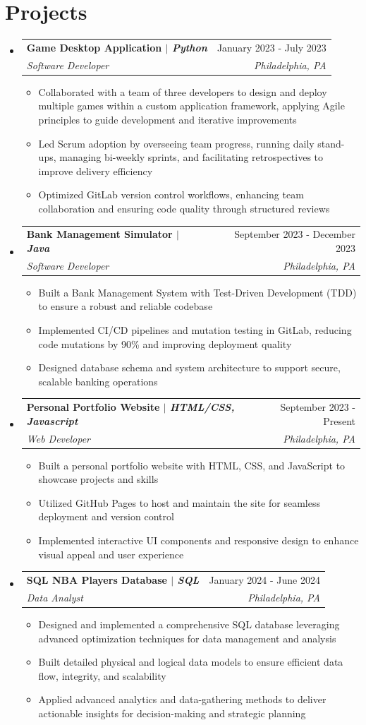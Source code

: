 \documentclass[letterpaper,11pt]{article}
\makeatletter
\newcommand{\resumeItem}[1]{
  \item\small{
    {#1 \vspace{-2pt}}
  }
}
\newcommand{\resumeSubheading}[4]{
  \vspace{-2pt}\item
    \begin{tabular*}{0.97\textwidth}[t]{l@{\extracolsep{\fill}}r}
      \textbf{#1} & #2 \\
      \textit{\small#3} & \textit{\small #4} \\
    \end{tabular*}\vspace{-7pt}
}
\newcommand{\resumeSubHeadingListStart}{\begin{itemize}[leftmargin=0.15in, label={}]}
\newcommand{\resumeSubHeadingListEnd}{\end{itemize}}
\newcommand{\resumeItemListStart}{\begin{itemize}}
\newcommand{\resumeItemListEnd}{\end{itemize}\vspace{-5pt}}
\makeatother
\begin{document}
\section{Projects}
  \resumeSubHeadingListStart
    \resumeSubheading
      {\textbf{Game Desktop Application} $|$ \emph{Python}}{January 2023 - July 2023}
      {Software Developer}{Philadelphia, PA}
      \resumeItemListStart
        \resumeItem{Collaborated with a team of three developers to design and deploy multiple games within a custom application framework, applying Agile principles to guide development and iterative improvements}
        \resumeItem{Led Scrum adoption by overseeing team progress, running daily stand-ups, managing bi-weekly sprints, and facilitating retrospectives to improve delivery efficiency}
        \resumeItem{Optimized GitLab version control workflows, enhancing team collaboration and ensuring code quality through structured reviews}
      \resumeItemListEnd
    \resumeSubheading
      {\textbf{Bank Management Simulator} $|$ \emph{Java}}{September 2023 - December 2023}
      {Software Developer}{Philadelphia, PA}
      \resumeItemListStart
        \resumeItem{Built a Bank Management System with Test-Driven Development (TDD) to ensure a robust and reliable codebase}
        \resumeItem{Implemented CI/CD pipelines and mutation testing in GitLab, reducing code mutations by 90\% and improving deployment quality}
        \resumeItem{Designed database schema and system architecture to support secure, scalable banking operations}
    \resumeItemListEnd
    \resumeSubheading
    {\textbf
      {Personal Portfolio Website} $|$ \emph{HTML/CSS, Javascript}}{September 2023 - Present}
      {Web Developer}{Philadelphia, PA}
      \resumeItemListStart
        \resumeItem{Built a personal portfolio website with HTML, CSS, and JavaScript to showcase projects and skills}
        \resumeItem{Utilized GitHub Pages to host and maintain the site for seamless deployment and version control}
        \resumeItem{Implemented interactive UI components and responsive design to enhance visual appeal and user experience}
      \resumeItemListEnd
      \resumeSubheading
      {\textbf{SQL NBA Players Database} $|$ \emph{SQL}}{January 2024 - June 2024}
      {Data Analyst}{Philadelphia, PA}
      \resumeItemListStart
        \resumeItem{Designed and implemented a comprehensive SQL database leveraging advanced optimization techniques for data management and analysis}
        \resumeItem{Built detailed physical and logical data models to ensure efficient data flow, integrity, and scalability}
        \resumeItem{Applied advanced analytics and data-gathering methods to deliver actionable insights for decision-making and strategic planning}
      \resumeItemListEnd
  \resumeSubHeadingListEnd
\end{document}
